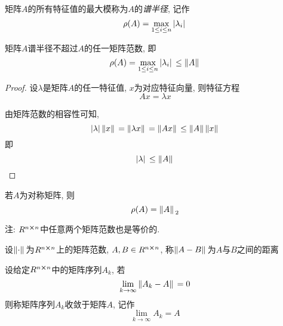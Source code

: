 \begin{definition}
    矩阵$A$的所有特征值的最大模称为$A$的\emph{谱半径}, 记作
    \begin{equation*}
        \rho(A)=\max_{1\le i\le n}\abs*{\lambda_i}
    \end{equation*}
\end{definition}

\begin{theorem}
    矩阵$A$谱半径不超过$A$的任一矩阵范数, 即
    \begin{equation*}
        \rho(A)=\max_{1\le i\le n}\abs*{\lambda_i}\le\norm*{A}
    \end{equation*}
\end{theorem}

\begin{proof}
    设$\lambda$是矩阵$A$的任一特征值, $x$为对应特征向量, 则特征方程
    \begin{equation*}
        Ax=\lambda x
    \end{equation*}

    由矩阵范数的相容性可知,
    \begin{equation*}
        \abs*{\lambda}\norm*{x}=\norm*{\lambda x}=\norm*{Ax}\le\norm*{A}\norm*{x}
    \end{equation*}
    即
    \begin{equation*}
        \abs*{\lambda}\le\norm*{A}
    \end{equation*}
\end{proof}

\begin{corollary}
    若$A$为对称矩阵, 则
    \begin{equation*}
        \rho(A)=\norm*{A}_2
    \end{equation*}
\end{corollary}

注: $R^{n\cross n}$中任意两个矩阵范数也是等价的.

\begin{definition}
    设$\norm*{\cdot}$为$R^{n\cross n}$上的矩阵范数, $A,B\in R^{n\cross n}$, 称$\norm*{A-B}$为$A$与$B$之间的距离
\end{definition}

\begin{definition}
    设给定$R^{n\cross n}$中的矩阵序列${A_k}$, 若
    \begin{equation*}
        \lim\limits_{k\to\infty}\norm*{A_k-A}=0
    \end{equation*}
    则称矩阵序列${A_k}$收敛于矩阵$A$, 记作
    \begin{equation*}
        \lim\limits_{k\to\infty}A_k=A
    \end{equation*}
\end{definition}

